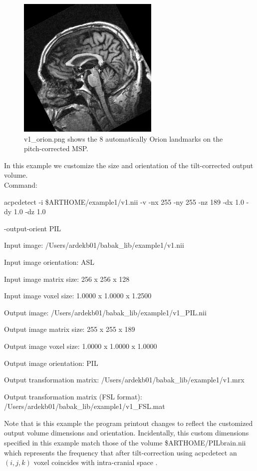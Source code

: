 \documentclass[11pt]{article}
\begin{document}
\begin{figure}
\begin{center}
\includegraphics[scale=1.0]{v1_orion.png}
\caption{v1\_orion.png shows the 8 automatically Orion landmarks on the pitch-corrected MSP.
}
\label{fig:orion}
\end{center}
\end{figure}

 In this example we customize the size and orientation of
the tilt-corrected output volume.\\
\noindent Command: 

acpcdetect -i \$ARTHOME/example1/v1.nii -v -nx 255 -ny 255 -nz 189 -dx 1.0 -dy 1.0 -dz 1.0 

-output-orient PIL


Input image: /Users/ardekb01/babak\_lib/example1/v1.nii

Input image orientation: ASL

Input image matrix size: 256 x 256 x 128

Input image voxel size: 1.0000 x 1.0000 x 1.2500

Output image: /Users/ardekb01/babak\_lib/example1/v1\_PIL.nii

Output image matrix size: 255 x 255 x 189 

Output image voxel size: 1.0000 x 1.0000 x 1.0000

Output image orientation: PIL

Output transformation matrix: /Users/ardekb01/babak\_lib/example1/v1.mrx

Output transformation matrix (FSL format): /Users/ardekb01/babak\_lib/example1/v1\_FSL.mat 

\noindent Note that is this example the program printout changes to reflect the customized output volume dimensions
and orientation.  Incidentally, this custom dimensions specified in this example match those of
the volume \$ARTHOME/PILbrain.nii which represents the frequency that after tilt-correction using
acpcdetect an $(i,j,k)$ voxel coincides with intra-cranial space \citep{ardekani2018}. \\
\end{document}
